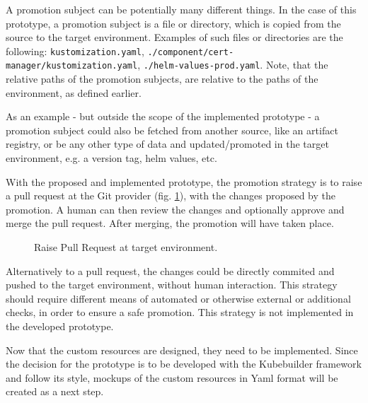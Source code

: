 A promotion subject can be potentially many different things.
In the case of this prototype,
a promotion subject is a file or directory,
which is copied from the source to the target environment.
Examples of such files or directories are the following:
\lstinline|kustomization.yaml|,
\lstinline|./component/cert-manager/kustomization.yaml|,
\lstinline|./helm-values-prod.yaml|.
Note, that the relative paths of the promotion subjects,
are relative to the paths of the environment, as defined earlier.

As an example - but outside the scope of the implemented prototype -
a promotion subject could also be fetched from another source,
like an artifact registry, or be any other type of data
and updated/promoted in the target environment,
e.g. a version tag, helm values, etc.

With the proposed and implemented prototype,
the promotion strategy is to raise a pull request at the Git provider
(fig. \ref{fig:raise-pull-request-and-approve}),
with the changes proposed by the promotion.
A human can then review the changes and optionally approve and merge the pull request.
After merging, the promotion will have taken place.

\begin{figure}[h]
	\centering
	\caption{Raise Pull Request at target environment.
	}
	\label{fig:raise-pull-request-and-approve}	
\end{figure}

Alternatively to a pull request, the changes could be directly
commited and pushed to the target environment,
without human interaction. This strategy should require different means
of automated or otherwise external or additional checks, in order to ensure a safe promotion.
This strategy is not implemented in the developed prototype.

Now that the custom resources are designed,
they need to be implemented.
Since the decision for the prototype is to be developed
with the Kubebuilder framework and follow its style,
mockups of the custom resources in Yaml format
will be created as a next step.









